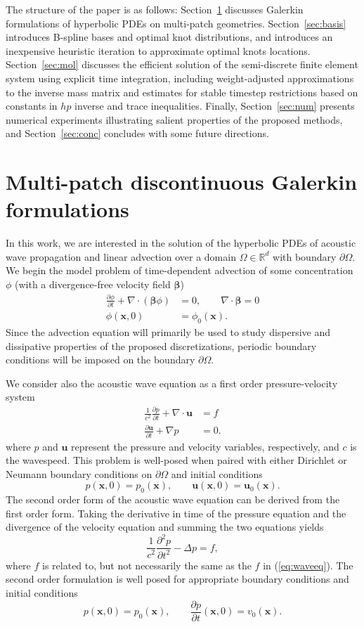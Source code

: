 \documentclass[preprint,10pt]{elsarticle}
\newcommand{\pd}[2]{\frac{\partial#1}{\partial#2}}
\newcommand{\pdd}[2]{\frac{\partial^2#1}{\partial#2^2}}
\newcommand{\LRp}[1]{\left( #1 \right)}
\newcommand{\Grad} {\ensuremath{\nabla}}
\newcommand{\Div} {\ensuremath{\nabla\cdot}}
\newcommand{\reviewerOne}[1]{#1}
\begin{document}
The structure of the paper is as follows: Section~\ref{sec:form2} discusses Galerkin formulations of hyperbolic PDEs on multi-patch geometries.  Section~\ref{sec:basis} introduces B-spline bases and optimal knot distributions, and introduces an inexpensive heuristic iteration to approximate optimal knots locations.  Section~\ref{sec:mol} discusses the efficient solution of the semi-discrete finite element system using explicit time integration, including weight-adjusted approximations to the inverse mass matrix and estimates for stable timestep restrictions based on constants in $hp$ inverse and trace inequalities.  Finally, Section~\ref{sec:num} presents numerical experiments illustrating salient properties of the proposed methods, and Section~\ref{sec:conc} concludes with some future directions.  

\section{Multi-patch discontinuous Galerkin formulations}
\label{sec:form2}

In this work, we are interested in the solution of the hyperbolic PDEs of acoustic wave propagation and linear advection over a domain $\Omega \in \mathbb{R}^d$ with boundary $\partial \Omega$.  We begin the model problem of time-dependent advection \reviewerOne{of some concentration $\phi$} (with a divergence-free velocity field $\bm{\beta}$) 
\begin{align*}
\pd{\phi}{t} + \Div \LRp{\bm{\beta}\phi} &= 0, \qquad \Div\bm{\beta} = 0\\
\phi(\bm{x},0) &= \phi_0(\bm{x}).
\end{align*}
Since the advection equation will primarily be used to study dispersive and dissipative properties of the proposed discretizations, periodic boundary conditions will be imposed on the boundary $\partial \Omega$.  

We consider also the acoustic wave equation as a first order pressure-velocity system
\begin{align}
\frac{1}{c^2}\pd{p}{t} + \Div \bm{u} &= f \label{eq:waveeq}\\
\pd{\bm{u}}{t} + \Grad p &= 0. \nonumber
\end{align} 
\reviewerOne{where $p$ and $\bm{u}$ represent the pressure and velocity variables, respectively, and $c$ is the wavespeed.}  
This problem is well-posed when paired with either Dirichlet or Neumann boundary conditions on $\partial \Omega$ and initial conditions 
\[
p(\bm{x},0) = p_0(\bm{x}), \qquad \bm{u}(\bm{x},0) = \bm{u}_0(\bm{x}).
\]
The second order form of the acoustic wave equation can be derived from the first order form.  Taking the derivative in time of the pressure equation and the divergence of the velocity equation and summing the two equations yields
\[
\reviewerOne{\frac{1}{c^2}}\pdd{p}{t} - \Delta p = f,  
\]
\reviewerOne{where $f$ is related to, but not necessarily the same as the $f$ in (\ref{eq:waveeq}).}
The second order formulation is well posed for appropriate boundary conditions and initial conditions 
\[
p(\bm{x},0) = p_0(\bm{x}), \qquad \pd{p}{t}(\bm{x},0) = v_0(\bm{x}).  
\]
\end{document}
